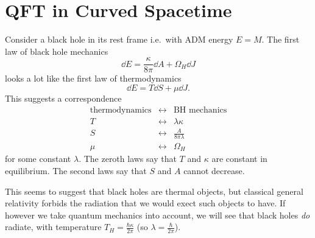 \documentclass{jknotes}
\begin{document}
\section{QFT in Curved Spacetime}
Consider a black hole in its rest frame i.e.\ with ADM energy \(E=M\). The first law of black hole mechanics
\begin{equation}
    \dd{E} = \frac{\kappa}{8\pi} \dd{A} + \Omega_H\dd{J}
\end{equation}
looks a lot like the first law of thermodynamics
\begin{equation}
    \dd{E} = T\dd{S} + \mu\dd{J}.
\end{equation}
This suggests a correspondence
\begin{equation}
    \begin{array}{rcl}
        \text{thermodynamics} & \leftrightarrow & \text{BH mechanics} \\
        T &\leftrightarrow& \lambda\kappa\\
        S &\leftrightarrow& \frac{A}{8\pi\lambda}\\
        \mu &\leftrightarrow& \Omega_H
    \end{array}
\end{equation}
for some constant \(\lambda\). The zeroth laws say that \(T\) and \(\kappa\) are constant in equilibrium. The second laws say that \(S\) and \(A\) cannot decrease.

This seems to suggest that black holes are thermal objects, but classical general relativity forbids the radiation that we would exect such objects to have. If however we take quantum mechanics into account, we will see that black holes \emph{do} radiate, with temperature \(T_H=\frac{\hbar\kappa}{2\pi}\) (so \(\lambda = \frac{\hbar}{2\pi}\)).
\end{document}
